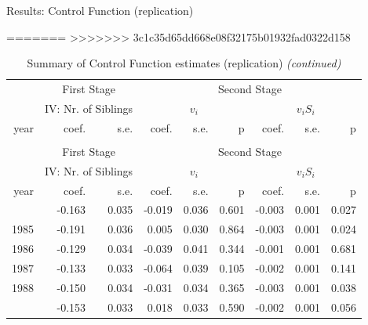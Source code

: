 \documentclass[10pt,ignorenonframetext,]{beamer}
\begin{document}
\begin{frame}{Results: Control Function (replication)}
\protect\hypertarget{results-control-function-replication}{}

=======
\textgreater{}\textgreater{}\textgreater{}\textgreater{}\textgreater{}\textgreater{}\textgreater{}
3c1c35d65dd668e08f32175b01932fad0322d158

\begingroup\fontsize{7}{9}\selectfont

\begin{longtable}[t]{rrrrrrrrr}
\caption{\label{tab:unnamed-chunk-2}Summary of Control Function estimates (replication)}\\
\toprule
\multicolumn{1}{c}{ } & \multicolumn{2}{c}{First Stage} & \multicolumn{6}{c}{Second Stage} \\
\cmidrule(l{2pt}r{2pt}){2-3} \cmidrule(l{2pt}r{2pt}){4-9}
\multicolumn{1}{c}{ } & \multicolumn{2}{c}{IV: Nr. of Siblings} & \multicolumn{3}{c}{$v_i$} & \multicolumn{3}{c}{$v_i S_i$} \\
\cmidrule(l{2pt}r{2pt}){2-3} \cmidrule(l{2pt}r{2pt}){4-6} \cmidrule(l{2pt}r{2pt}){7-9}
year & coef. & s.e. & coef. & s.e. & p & coef. & s.e. & p\\
\midrule
\endfirsthead
\caption[]{Summary of Control Function estimates (replication) \textit{(continued)}}\\
\toprule
\multicolumn{1}{c}{ } & \multicolumn{2}{c}{First Stage} & \multicolumn{6}{c}{Second Stage} \\
\cmidrule(l{2pt}r{2pt}){2-3} \cmidrule(l{2pt}r{2pt}){4-9}
\multicolumn{1}{c}{ } & \multicolumn{2}{c}{IV: Nr. of Siblings} & \multicolumn{3}{c}{$v_i$} & \multicolumn{3}{c}{$v_i S_i$} \\
\cmidrule(l{2pt}r{2pt}){2-3} \cmidrule(l{2pt}r{2pt}){4-6} \cmidrule(l{2pt}r{2pt}){7-9}
year & coef. & s.e. & coef. & s.e. & p & coef. & s.e. & p\\
\midrule
\endhead
\
\endfoot
\bottomrule
\endlastfoot
1984 & -0.163 & 0.035 & -0.019 & 0.036 & 0.601 & -0.003 & 0.001 & 0.027\\
1985 & -0.191 & 0.036 & 0.005 & 0.030 & 0.864 & -0.003 & 0.001 & 0.024\\
1986 & -0.129 & 0.034 & -0.039 & 0.041 & 0.344 & -0.001 & 0.001 & 0.681\\
1987 & -0.133 & 0.033 & -0.064 & 0.039 & 0.105 & -0.002 & 0.001 & 0.141\\
1988 & -0.150 & 0.034 & -0.031 & 0.034 & 0.365 & -0.003 & 0.001 & 0.038\\
\addlinespace
1989 & -0.153 & 0.033 & 0.018 & 0.033 & 0.590 & -0.002 & 0.001 & 0.056\\

\end{longtable}
\end{frame}
\end{document}
